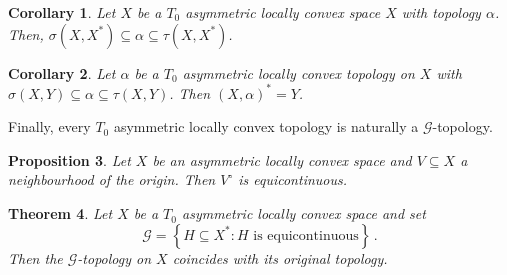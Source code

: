 \documentclass[
	paper=A4,
	pagesize=auto,
	fontsize=12pt
]{scrartcl}
\theoremstyle{plain}
\newtheorem{theorem}{Theorem}[section]
\newtheorem{proposition}[theorem]{Proposition}
\newtheorem{corollary}[theorem]{Corollary}
\theoremstyle{remark}
\theoremstyle{definition}
\begin{document}
%
\begin{corollary}
Let $X$ be a $T_0$ asymmetric locally convex space $X$ with topology $\alpha$.
Then, $\sigma(X, X^*) \subseteq \alpha \subseteq \tau(X, X^*)$.
\end{corollary}
%
\begin{corollary}
Let $\alpha$ be a $T_0$ asymmetric locally convex topology on $X$ with $\sigma(X, Y) \subseteq \alpha \subseteq \tau(X, Y)$.
Then $(X, \alpha)^* = Y$.
\end{corollary}
%
Finally, every $T_0$ asymmetric locally convex topology is naturally a $\mathcal{G}$-topology.
%
\begin{proposition}
\label{prop:PolarOfNeighbourhoodIsEquicontinuous}
Let $X$ be an asymmetric locally convex space and $V \subseteq X$ a neighbourhood of the origin.
Then $V^\circ$ is equicontinuous.
\end{proposition}
%
\begin{theorem}
Let $X$ be a $T_0$ asymmetric locally convex space and set
%
\begin{equation}
\mathcal{G} = \left\{
H \subseteq X^* : \text{$H$ is equicontinuous}
\right\} \, .
\end{equation}
%
Then the $\mathcal{G}$-topology on $X$ coincides with its original topology.
\end{theorem}
\end{document}
